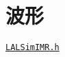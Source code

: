 \chapter{波形}

\href{https://lscsoft.docs.ligo.org/lalsuite/lalsimulation/group___l_a_l_sim_i_m_r__h.html}{\texttt{LALSimIMR.h}}
